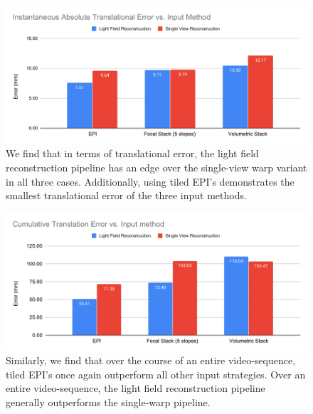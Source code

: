 \begin{figure}[H]
    \includegraphics[width=\textwidth]{images/result-examples/bargraphs/iate-vs-inputmethod.pdf}
    \caption[Instantaneous translational errors vs. input methods.]{We find that in terms of translational error, the light field reconstruction pipeline has an edge over the single-view warp variant in all three cases. Additionally, using tiled EPI's demonstrates the smallest translational error of the three input methods.}
\end{figure}
\begin{figure}[H]
    \includegraphics[width=\textwidth]{images/result-examples/bargraphs/cte-vs-inputmethod.pdf}
    \caption[Cumulative translational errors vs. input methods.]{Similarly, we find that over the course of an entire video-sequence, tiled EPI's once again outperform all other input strategies. Over an entire video-sequence, the light field reconstruction pipeline generally outperforms the single-warp pipeline.}
\end{figure}

